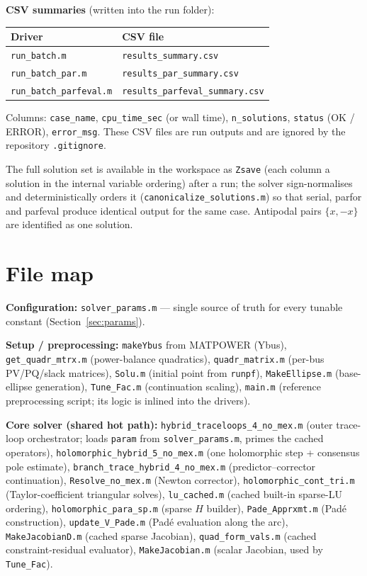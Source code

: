 \documentclass[11pt,a4paper]{article}
\newcommand{\code}[1]{\texttt{#1}}
\begin{document}
\textbf{CSV summaries} (written into the run folder):
\begin{center}\small
\begin{tabular}{@{}ll@{}}
\toprule
Driver & CSV file\\
\midrule
\code{run_batch.m}          & \code{results_summary.csv}\\
\code{run_batch_par.m}      & \code{results_par_summary.csv}\\
\code{run_batch_parfeval.m} & \code{results_parfeval_summary.csv}\\
\bottomrule
\end{tabular}
\end{center}
Columns: \code{case_name}, \code{cpu_time_sec} (or wall time), \code{n_solutions},
\code{status} (OK / ERROR), \code{error_msg}.
These CSV files are run outputs and are ignored by the repository \code{.gitignore}.

The full solution set is available in the workspace as \code{Zsave} (each column a
solution in the internal variable ordering) after a run; the solver sign-normalises and
deterministically orders it (\code{canonicalize_solutions.m}) so that serial, parfor and
parfeval produce identical output for the same case. Antipodal pairs $\{x,-x\}$ are
identified as one solution.

\section{File map}

\textbf{Configuration:} \code{solver_params.m} --- single source of truth for every
tunable constant (Section~\ref{sec:params}).

\textbf{Setup / preprocessing:}
\code{makeYbus} from MATPOWER (Ybus), \code{get_quadr_mtrx.m} (power-balance quadratics),
\code{quadr_matrix.m} (per-bus PV/PQ/slack matrices), \code{Solu.m} (initial point from
\code{runpf}), \code{MakeEllipse.m} (base-ellipse generation), \code{Tune_Fac.m}
(continuation scaling), \code{main.m} (reference preprocessing script; its logic is
inlined into the drivers).

\textbf{Core solver (shared hot path):}
\code{hybrid_traceloops_4_no_mex.m} (outer trace-loop orchestrator; loads \code{param}
from \code{solver_params.m}, primes the cached operators), \code{holomorphic_hybrid_5_no_mex.m} (one
holomorphic step + consensus pole estimate), \code{branch_trace_hybrid_4_no_mex.m}
(predictor--corrector continuation), \code{Resolve_no_mex.m} (Newton corrector),
\code{holomorphic_cont_tri.m} (Taylor-coefficient triangular solves),
\code{lu_cached.m} (cached built-in sparse-LU ordering),
\code{holomorphic_para_sp.m} (sparse $H$ builder), \code{Pade_Apprxmt.m} (Pad\'e
construction), \code{update_V_Pade.m} (Pad\'e evaluation along the arc),
\code{MakeJacobianD.m} (cached sparse Jacobian), \code{quad_form_vals.m} (cached
constraint-residual evaluator), \code{MakeJacobian.m} (scalar Jacobian, used by
\code{Tune_Fac}).
\end{document}
